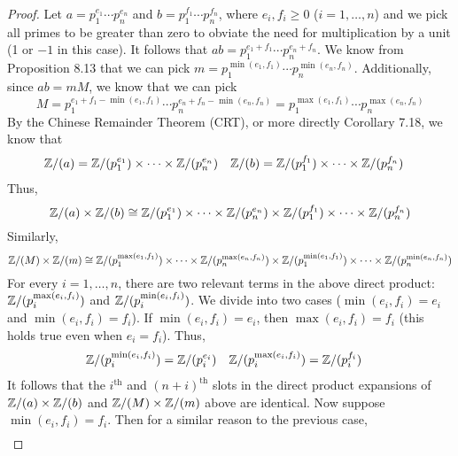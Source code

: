 \documentclass[../psets.tex]{subfiles}
\begin{document}
\begin{enumerate}
\begin{enumerate}
\begin{proof}
            Let $a=p_1^{e_1}\cdots p_n^{e_n}$ and $b=p_1^{f_1}\cdots p_n^{f_n}$, where $e_i,f_i\geq 0$ ($i=1,\dots,n$) and we pick all primes to be greater than zero to obviate the need for multiplication by a unit (1 or $-1$ in this case). It follows that $ab=p_1^{e_1+f_1}\cdots p_n^{e_n+f_n}$. We know from Proposition 8.13 that we can pick $m=p_1^{\min(e_1,f_1)}\cdots p_n^{\min(e_n,f_n)}$. Additionally, since $ab=mM$, we know that we can pick 
            \begin{equation*}
                M = p_1^{e_1+f_1-\min(e_1,f_1)}\cdots p_n^{e_n+f_n-\min(e_n,f_n)}
                = p_1^{\max(e_1,f_1)}\cdots p_n^{\max(e_n,f_n)}
            \end{equation*}
            By the Chinese Remainder Theorem (CRT), or more directly Corollary 7.18, we know that
            \begin{align*}
                \mathbb{Z}/(a) &= \mathbb{Z}/(p_1^{e_1})\times\cdots\times\mathbb{Z}/(p_n^{e_n})&
                \mathbb{Z}/(b) &= \mathbb{Z}/(p_1^{f_1})\times\cdots\times\mathbb{Z}/(p_n^{f_n})
            \end{align*}
            Thus,
            \begin{equation*}
                \mathbb{Z}/(a)\times\mathbb{Z}/(b) \cong \mathbb{Z}/(p_1^{e_1})\times\cdots\times\mathbb{Z}/(p_n^{e_n})\times\mathbb{Z}/(p_1^{f_1})\times\cdots\times\mathbb{Z}/(p_n^{f_n})
            \end{equation*}
            Similarly,
            \begin{equation*}
                \mathbb{Z}/(M)\times\mathbb{Z}/(m) \cong \mathbb{Z}/(p_1^{\max(e_1,f_1)})\times\cdots\times\mathbb{Z}/(p_n^{\max(e_n,f_n)})\times\mathbb{Z}/(p_1^{\min(e_1,f_1)})\times\cdots\times\mathbb{Z}/(p_n^{\min(e_n,f_n)})
            \end{equation*}
            For every $i=1,\dots,n$, there are two relevant terms in the above direct product: $\mathbb{Z}/(p_i^{\max(e_i,f_i)})$ and $\mathbb{Z}/(p_i^{\min(e_i,f_i)})$. We divide into two cases ($\min(e_i,f_i)=e_i$ and $\min(e_i,f_i)=f_i$). If $\min(e_i,f_i)=e_i$, then $\max(e_i,f_i)=f_i$ (this holds true even when $e_i=f_i$). Thus,
            \begin{align*}
                \mathbb{Z}/(p_i^{\min(e_i,f_i)}) &= \mathbb{Z}/(p_i^{e_i})&
                \mathbb{Z}/(p_i^{\max(e_i,f_i)}) &= \mathbb{Z}/(p_i^{f_i})
            \end{align*}
            It follows that the $i^\text{th}$ and $(n+i)^\text{th}$ slots in the direct product expansions of $\mathbb{Z}/(a)\times\mathbb{Z}/(b)$ and $\mathbb{Z}/(M)\times\mathbb{Z}/(m)$ above are identical. Now suppose $\min(e_i,f_i)=f_i$. Then for a similar reason to the previous case,
            \begin{align*}

\end{align*}
\end{proof}
\end{enumerate}
\end{enumerate}
\end{document}
